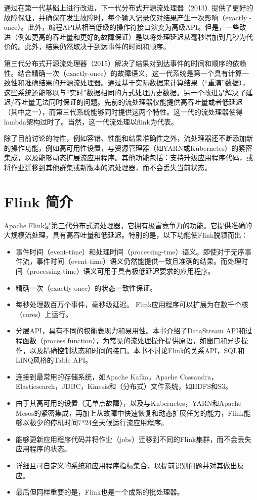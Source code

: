 \documentclass[oneside]{ctexbook}
\begin{document}
通过在第一代基础上进行改进，下一代分布式开源流处理器（2013）提供了更好的故障保证，并确保在发生故障时，每个输入记录仅对结果产生一次影响（exactly -once）。此外，编程API从相当低级的操作符接口演变为高级API。但是，一些改进（例如更高的吞吐量和更好的故障保证）是以将处理延迟从毫秒增加到几秒为代价的。此外，结果仍然取决于到达事件的时间和顺序。

第三代分布式开源流处理器（2015）解决了结果对到达事件的时间和顺序的依赖性。结合精确一次（exactly-once）的故障语义，这一代系统是第一个具有计算一致性和准确结果的开源流处理器。通过基于实际数据来计算结果（“重演”数据），这些系统还能够以与“实时”数据相同的方式处理历史数据。另一个改进是解决了延迟/吞吐量无法同时保证的问题。先前的流处理器仅能提供高吞吐量或者低延迟（其中之一），而第三代系统能够同时提供这两个特性。这一代的流处理器使得lambda架构过时了。当然，这一代流处理以flink为代表。

除了目前讨论的特性，例如容错、性能和结果准确性之外，流处理器还不断添加新的操作功能，例如高可用性设置，与资源管理器（如YARN或Kubernetes）的紧密集成，以及能够动态扩展流应用程序。其他功能包括：支持升级应用程序代码，或将作业迁移到其他群集或新版本的流处理器，而不会丢失当前状态。

\section{Flink 简介}

Apache Flink是第三代分布式流处理器，它拥有极富竞争力的功能。它提供准确的大规模流处理，具有高吞吐量和低延迟。特别的是，以下功能使Flink脱颖而出：

\begin{itemize}
  \item 事件时间（event-time）和处理时间（processing-tme）语义。即使对于无序事件流，事件时间（event-time）语义仍然能提供一致且准确的结果。而处理时间（processing-time）语义可用于具有极低延迟要求的应用程序。
  \item 精确一次（exactly-once）的状态一致性保证。
  \item 每秒处理数百万个事件，毫秒级延迟。 Flink应用程序可以扩展为在数千个核（cores）上运行。
  \item 分层API，具有不同的权衡表现力和易用性。本书介绍了DataStream API和过程函数（process function），为常见的流处理操作提供原语，如窗口和异步操作，以及精确控制状态和时间的接口。本书不讨论Flink的关系API，SQL和LINQ风格的Table API。
  \item 连接到最常用的存储系统，如Apache Kafka，Apache Cassandra，Elasticsearch，JDBC，Kinesis和（分布式）文件系统，如HDFS和S3。
  \item 由于其高可用的设置（无单点故障），以及与Kubernetes，YARN和Apache Mesos的紧密集成，再加上从故障中快速恢复和动态扩展任务的能力，Flink能够以极少的停机时间7*24全天候运行流应用程序。
  \item 能够更新应用程序代码并将作业（jobs）迁移到不同的Flink集群，而不会丢失应用程序的状态。
  \item 详细且可自定义的系统和应用程序指标集合，以提前识别问题并对其做出反应。
  \item 最后但同样重要的是，Flink也是一个成熟的批处理器。
\end{itemize}
\end{document}
